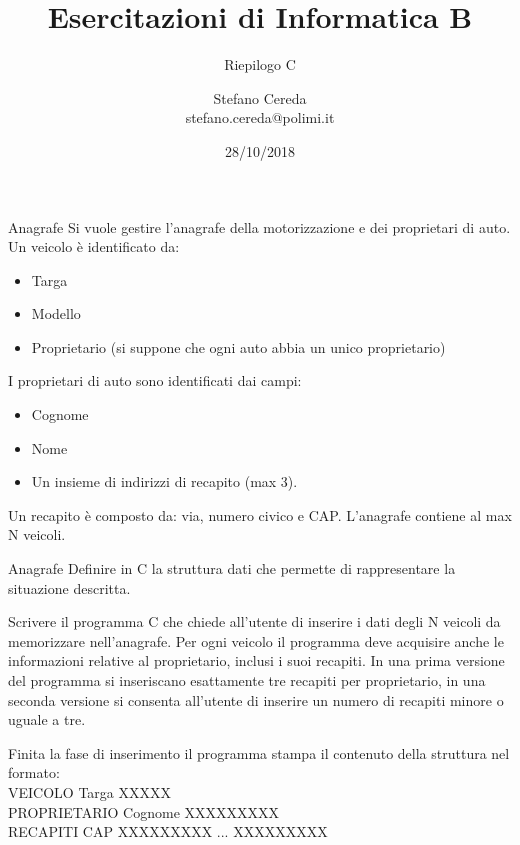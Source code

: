 \documentclass[aspectratio=169, handout]{beamer}
\title{Esercitazioni di Informatica B}
\subtitle{Riepilogo C}
\author{Stefano Cereda\\
stefano.cereda@polimi.it
}
\date{28/10/2018}
\institute[PoliMi]{Politecnico Milano}
\begin{document}
\begin{frame}
    \maketitle
\end{frame}

\begin{frame}{Anagrafe}
    Si vuole gestire l’anagrafe della motorizzazione e dei proprietari di auto. Un veicolo è identificato da:
    \begin{itemize}
        \item Targa
        \item Modello
        \item Proprietario (si suppone che ogni auto abbia un unico proprietario)
    \end{itemize}

    I proprietari di auto sono identificati dai campi:
    \begin{itemize}
        \item Cognome
        \item Nome
        \item Un insieme di indirizzi di recapito (max 3).
    \end{itemize}

    Un recapito è composto da: via, numero civico e CAP. L’anagrafe contiene al max N veicoli.
\end{frame}

{
    \small
    \begin{frame}{Anagrafe}
        Definire in C la struttura dati che permette di rappresentare la situazione descritta.

        Scrivere il programma C che chiede all’utente di inserire i dati degli N veicoli da memorizzare
        nell’anagrafe. Per ogni veicolo il programma deve acquisire anche le informazioni relative al
        proprietario, inclusi i suoi recapiti. In una prima versione del programma si inseriscano esattamente
        tre recapiti per proprietario, in una seconda versione si consenta all’utente di inserire un numero di
        recapiti minore o uguale a tre.

        Finita la fase di inserimento il programma stampa il contenuto della struttura nel formato:\\
        VEICOLO Targa XXXXX \\
        PROPRIETARIO Cognome XXXXXXXXX \\
        RECAPITI CAP XXXXXXXXX ... XXXXXXXXX \\
    \end{frame}
}
\end{document}
